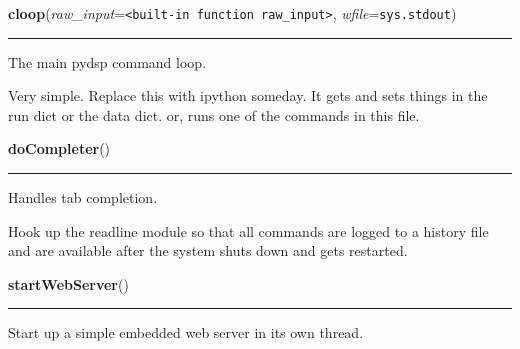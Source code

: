     \begin{boxedminipage}{\textwidth}

    \raggedright \textbf{cloop}(\textit{raw\_input}=\texttt{{\textless}built-in function raw\_input{\textgreater}}, \textit{wfile}=\texttt{sys.stdout})

    \vspace{-1.5ex}

    \rule{\textwidth}{0.5\fboxrule}
    The main pydsp command loop.

    Very simple. Replace this with ipython someday. It gets and sets things
    in the run dict or the data dict. or, runs one of the commands in this 
    file.

    \vspace{1ex}

    \end{boxedminipage}

    \label{pydsp:doCompleter}

    \vspace{0.5ex}

    \begin{boxedminipage}{\textwidth}

    \raggedright \textbf{doCompleter}()

    \vspace{-1.5ex}

    \rule{\textwidth}{0.5\fboxrule}
    Handles tab completion.

    Hook up the readline module so that all commands are logged to a 
    history file and are available after the system shuts down and gets 
    restarted.

    \vspace{1ex}

    \end{boxedminipage}

    \label{pydsp:startWebServer}

    \vspace{0.5ex}

    \begin{boxedminipage}{\textwidth}

    \raggedright \textbf{startWebServer}()

    \vspace{-1.5ex}

    \rule{\textwidth}{0.5\fboxrule}
    Start up a simple embedded web server in its own thread.

    \vspace{1ex}

    \end{boxedminipage}

